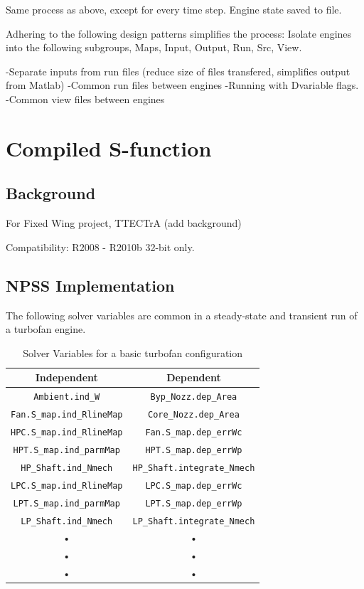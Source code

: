 \documentclass[heading.tex]{subfiles}
\begin{document}
Same process as above, except for every time step. Engine state saved to file.

Adhering to the following design patterns simplifies the process:
Isolate engines into the following subgroups, Maps, Input, Output, Run, Src, View.

-Separate inputs from run files (reduce size of files transfered, simplifies output from Matlab)
-Common run files between engines -Running with Dvariable flags.
-Common view files between engines



\section{Compiled S-function}
\subsection{Background}
For Fixed Wing project, TTECTrA (add background)

Compatibility: R2008 - R2010b 32-bit only.

\subsection{NPSS Implementation}

The following solver variables are common in a steady-state and transient run of a turbofan
engine.

\begin{table}[H]
\centering
\begin{tabular}{|c|c|}
\hline 
Independent & Dependent \\ 
\hline \hline
\texttt{Ambient.ind\_W} & \texttt{Byp\_Nozz.dep\_Area} \\ 
\hline 
\texttt{Fan.S\_map.ind\_RlineMap} & \texttt{Core\_Nozz.dep\_Area} \\ 
\hline 
\texttt{HPC.S\_map.ind\_RlineMap} & \texttt{Fan.S\_map.dep\_errWc} \\ 
\hline 
\texttt{HPT.S\_map.ind\_parmMap} & \texttt{HPT.S\_map.dep\_errWp} \\ 
\hline 
\texttt{HP\_Shaft.ind\_Nmech} & \texttt{HP\_Shaft.integrate\_Nmech} \\ 
\hline 
\texttt{LPC.S\_map.ind\_RlineMap} & \texttt{LPC.S\_map.dep\_errWc} \\ 
\hline 
\texttt{LPT.S\_map.ind\_parmMap} & \texttt{LPT.S\_map.dep\_errWp} \\ 
\hline 
\texttt{LP\_Shaft.ind\_Nmech} & \texttt{LP\_Shaft.integrate\_Nmech} \\ 
\hline 
• & • \\ 
\hline 
• & • \\ 
\hline 
• & • \\ 
\hline 
\end{tabular} 
\caption{Solver Variables for a basic turbofan configuration}
\label{tab:SolverVariables}
\end{table}
\end{document}

